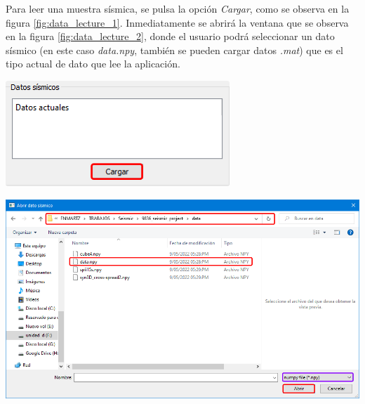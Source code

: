 \documentclass[12pt,oneside,a4]{ol-softwaremanual}
\newenvironment{Figure}
  {\par\medskip\noindent\minipage{\linewidth}}
  {\endminipage\par\medskip}
\begin{document}
\begin{multicols}{2}
Para leer una muestra sísmica, se pulsa la opción \emph{Cargar}, como se observa en la figura \ref{fig:data_lecture_1}. Inmediatamente se abrirá la ventana que se observa en la figura \ref{fig:data_lecture_2}, donde el usuario podrá seleccionar un dato sísmico (en este caso \emph{data.npy}, también se pueden cargar datos \emph{.mat}) que es el tipo actual de dato que lee la aplicación.

\begin{Figure}
    \centering
    \includegraphics[width=.7\linewidth]{data-lecture-1.png}
    \label{fig:data_lecture_1}
\end{Figure}

\end{multicols}

\begin{Figure}
    \centering
    \includegraphics[width=1\linewidth]{data-lecture-2.png}
    \label{fig:data_lecture_2}
\end{Figure}
\end{document}
